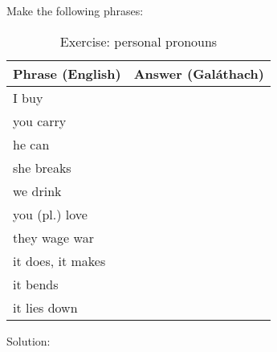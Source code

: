 Make the following phrases:\\
\begin{table}[H]
\centering
\begin{tabu}{|l|p{10.0cm}|}
  \toprule
  \textbf{Phrase (English)} & \textbf{Answer (Gal\'{a}thach)}\\
  \toprule
  I buy & \\
  \midrule
  you carry & \\
  \midrule
  he can & \\
  \midrule
  she breaks & \\
  \midrule
  we drink & \\
  \midrule
  you (pl.) love & \\
  \midrule
  they wage war & \\
  \midrule
  it does, it makes & \\
  \midrule
  it bends & \\
  \midrule
  it lies down & \\
  \bottomrule
\end{tabu}
\label{exercise_personal_pronouns}
\caption{Exercise: personal pronouns}
\end{table}

\newpage
Solution:
\begin{table}[H]
\centering
{}
\label{solution_phrases}
\caption{Solution: phrases}
\end{table}
